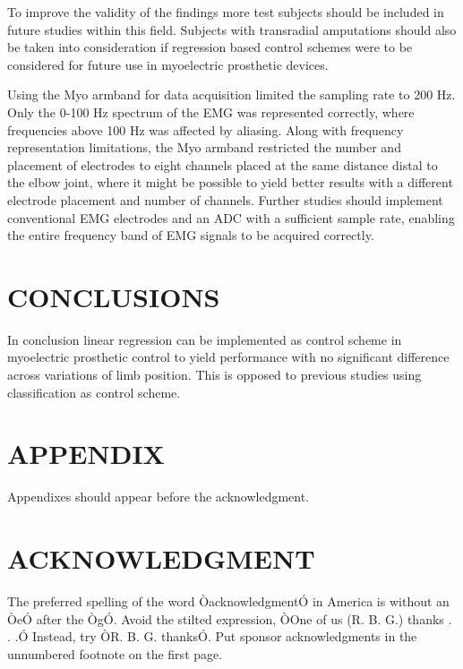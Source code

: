 \begin{multicols}{2}
To improve the validity of the findings more test subjects should be included in future studies within this field. Subjects with transradial amputations should also be taken into consideration if regression based control schemes were to be considered for future use in myoelectric prosthetic devices. 

Using the Myo armband for data acquisition limited the sampling rate to 200 Hz. Only the 0-100 Hz spectrum of the EMG was represented correctly, where frequencies above 100 Hz was affected by aliasing. Along with frequency representation limitations, the Myo armband restricted the number and placement of electrodes to eight channels placed at the same distance distal to the elbow joint, where it might be possible to yield better results with a different electrode placement and number of channels. Further studies should implement conventional EMG electrodes and an ADC with a sufficient sample rate, enabling the entire frequency band of EMG signals to be acquired correctly.		
	
\section{CONCLUSIONS}%
	
% 		
In conclusion linear regression can be implemented as control scheme in myoelectric prosthetic control to yield performance with no significant difference across variations of limb position. This is opposed to previous studies using classification as control scheme.
 		
	
	
	
	
	
	
	
	\section*{APPENDIX}
	
	Appendixes should appear before the acknowledgment.
	
	\section*{ACKNOWLEDGMENT}
	
	The preferred spelling of the word ÒacknowledgmentÓ in America is without an ÒeÓ after the ÒgÓ. Avoid the stilted expression, ÒOne of us (R. B. G.) thanks . . .Ó  Instead, try ÒR. B. G. thanksÓ. Put sponsor acknowledgments in the unnumbered footnote on the first page.
	
\end{multicols}
	
